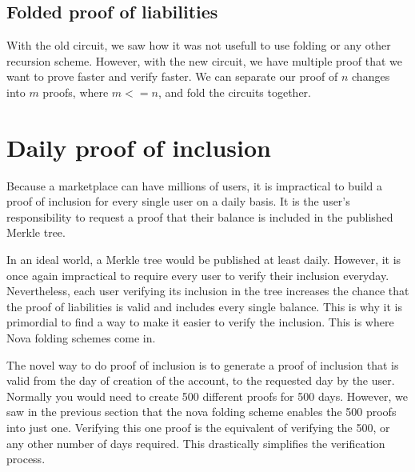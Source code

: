 \subsection{Folded proof of liabilities}
With the old circuit, we saw how it was not usefull to use folding or any other recursion scheme.
However, with the new circuit, we have multiple proof that we want to prove faster and verify faster.
We can separate our proof of $n$ changes into $m$ proofs, where $m <= n$, and fold the circuits together.



\section{Daily proof of inclusion}


Because a marketplace can have millions of users, it is impractical to build a proof of inclusion for every single user on a daily basis.
It is the user's responsibility to request a proof that their balance is included in the published Merkle tree.


In an ideal world, a Merkle tree would be published at least daily. However, it is once again impractical to require every user to verify their inclusion everyday.
Nevertheless, each user verifying its inclusion in the tree increases the chance that the proof of liabilities is valid and includes every single balance.
This is why it is primordial to find a way to make it easier to verify the inclusion. This is where Nova folding schemes come in.


The novel way to do proof of inclusion is to generate a proof of inclusion that is valid from the day of creation of the account, to the requested day by the user.
Normally you would need to create 500 different proofs for 500 days. However, we saw in the previous section that the nova folding scheme enables the 500 proofs into just one.
Verifying this one proof is the equivalent of verifying the 500, or any other number of days required.
This drastically simplifies the verification process.



